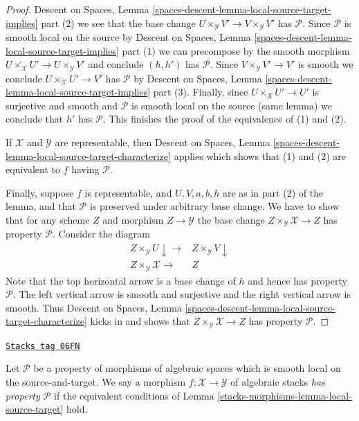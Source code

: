 \begin{proof}
Descent on Spaces, Lemma
\ref{spaces-descent-lemma-local-source-target-implies} part (2)
we see
that the base change $U \times_\mathcal{Y} V' \to V \times_\mathcal{Y} V'$
has $\mathcal{P}$. Since $\mathcal{P}$ is smooth local on the source by
Descent on Spaces, Lemma
\ref{spaces-descent-lemma-local-source-target-implies} part (1)
we can precompose by the smooth morphism
$U \times_\mathcal{X} U' \to U \times_\mathcal{Y} V'$ and
conclude $(h, h')$ has $\mathcal{P}$.
Since $V \times_\mathcal{Y} V' \to V'$ is smooth we conclude
$U \times_\mathcal{X} U' \to V'$ has $\mathcal{P}$ by
Descent on Spaces, Lemma
\ref{spaces-descent-lemma-local-source-target-implies} part (3).
Finally, since $U \times_X U' \to U'$
is surjective and smooth and $\mathcal{P}$ is smooth local
on the source (same lemma) we conclude
that $h'$ has $\mathcal{P}$. This finishes the proof of the equivalence
of (1) and (2).

\medskip\noindent
If $\mathcal{X}$ and $\mathcal{Y}$ are representable, then
Descent on Spaces,
Lemma \ref{spaces-descent-lemma-local-source-target-characterize}
applies which shows that (1) and (2) are equivalent to $f$ having
$\mathcal{P}$.

\medskip\noindent
Finally, suppose $f$ is representable, and $U, V, a, b, h$ are
as in part (2) of the lemma, and that $\mathcal{P}$ is preserved under
arbitrary base change. We have to show that for any scheme
$Z$ and morphism $Z \to \mathcal{Y}$ the base change
$Z \times_\mathcal{Y} \mathcal{X} \to Z$
has property $\mathcal{P}$. Consider the diagram
$$
\begin{array}{cc}Z \times_\mathcal{Y} U \downarrow\longrightarrow & Z \times_\mathcal{Y} V \downarrow \\ Z \times_\mathcal{Y} \mathcal{X} \longrightarrow & Z\end{array}
$$
Note that the top horizontal arrow is a base change of $h$ and
hence has property $\mathcal{P}$. The left vertical arrow is smooth
and surjective and the right vertical arrow is smooth. Thus
Descent on Spaces,
Lemma \ref{spaces-descent-lemma-local-source-target-characterize}
kicks in and shows that $Z \times_\mathcal{Y} \mathcal{X} \to Z$
has property $\mathcal{P}$.
\end{proof}

\begin{definition}[P]
\label{stacks-morphisms-definition-P}
\href{https://stacks.math.columbia.edu/tag/06FN}{\texttt{Stacks tag 06FN}}

Let $\mathcal{P}$ be a property of morphisms of algebraic spaces
which is smooth local on the source-and-target.
We say a morphism $f : \mathcal{X} \to \mathcal{Y}$ of algebraic stacks
{\it has property $\mathcal{P}$} if the equivalent conditions of
Lemma \ref{stacks-morphisms-lemma-local-source-target}
hold.
\end{definition}

